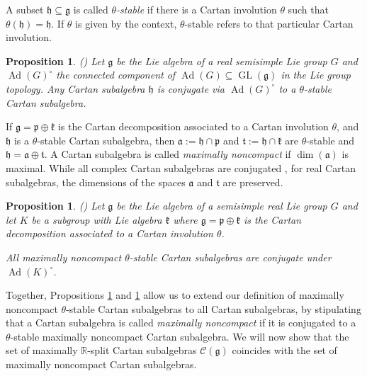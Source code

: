 \documentclass[12pt]{amsart}
\newcommand{\R}{\mathbb{R} }
\newcommand{\frakg}{\mathfrak{g}}
\newcommand{\frakp}{\mathfrak{p}}
\newcommand{\frakk}{\mathfrak{k}}
\newcommand{\fraka}{\mathfrak{a}}
\newcommand{\frakh}{\mathfrak{h}}
\newcommand{\frakt}{\mathfrak{t}}
\numberwithin{equation}{section}
\newtheorem{proposition}[theorem]{Proposition}
\theoremstyle{remark} %
\begin{document}
A subset $\frakh\subseteq \frakg$ is called \emph{$\theta$-stable} if there is a Cartan involution $\theta$ such that $\theta(\frakh) = \frakh$. If $\theta$ is given by the context, $\theta$-stable refers to that particular Cartan involution. 
\begin{proposition}\label{prop:Kna_real_Cartan_conj}(\cite[Prop 6.59]{Kna})
	Let $\frakg$ be the Lie algebra of a real semisimple Lie group $G$ and $\operatorname{Ad}(G)^\circ$ the connected component of $\operatorname{Ad}(G) \subseteq \operatorname{GL}(\frakg)$ in the Lie group topology. Any Cartan subalgebra $\frakh$ is conjugate via $\operatorname{Ad}(G)^\circ$ to a $\theta$-stable Cartan subalgebra.
\end{proposition}
If $\frakg = \frakp \oplus \frakk$ is the Cartan decomposition associated to a Cartan involution $\theta$, and $\frakh$ is a $\theta$-stable Cartan subalgebra, then $\fraka := \frakh \cap \frakp$ and $\frakt := \frakh \cap \frakk$ are $\theta$-stable and $\frakh = \fraka \oplus \frakt$. A Cartan subalgebra is called \emph{maximally noncompact} if $\dim(\fraka)$ is maximal. %
While all complex Cartan subalgebras are conjugated \cite[Theorem 2.15]{Kna}, for real Cartan subalgebras, the dimensions of the spaces $\fraka$ and $\frakt$ are preserved.
\begin{proposition}\label{prop:Kna_real_theta_Cartan_conj}(\cite[Prop 6.61]{Kna}) Let $\frakg$ be the Lie algebra of a semisimple real Lie group $G$ and let $K$ be a subgroup with Lie algebra $\frakk$ where $\frakg = \frakp \oplus \frakk$ is the Cartan decomposition associated to a Cartan involution $\theta$. 
	
	All maximally noncompact $\theta$-stable Cartan subalgebras are conjugate under $\operatorname{Ad}(K)^\circ$.
\end{proposition}
Together, Propositions \ref{prop:Kna_real_Cartan_conj} and \ref{prop:Kna_real_theta_Cartan_conj} allow us to extend our definition of maximally noncompact $\theta$-stable Cartan subalgebras to all Cartan subalgebras, by stipulating that a Cartan subalgebra is called \emph{maximally noncompact} if it is conjugated to a $\theta$-stable maximally noncompact Cartan subalgebra.
We will now show that the set of maximally $\R$-split Cartan subalgebras $\mathcal{C}(\frakg)$ coincides with the set of maximally noncompact Cartan subalgebras.
\end{document}
